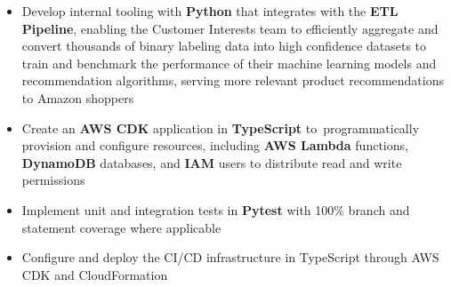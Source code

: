 \documentclass{article}
\newcommand{\resumesection}[3]{
    \subsection*{#1}
    \ 
    \normalsize
    \normalsize
    \hfill
    \textcolor{black}{#3}
    \normalsize
    \newline
    \small
    \textcolor{grey}{\emph{#2}}
}
\begin{document}
\begin{itemize}
    \item Develop internal tooling with \textbf{Python} that integrates with the \textbf{ETL Pipeline}, enabling the Customer Interests team to efficiently aggregate and convert thousands of binary labeling data into high confidence datasets to train and benchmark the performance of their machine learning models and recommendation algorithms, serving more relevant product recommendations to Amazon shoppers
    \item Create an \textbf{AWS CDK} application in \textbf{TypeScript} to\ programmatically provision and configure resources, including \textbf{AWS Lambda} functions, \textbf{DynamoDB} databases, and \textbf{IAM} users to distribute read and write permissions
    \item Implement unit and integration tests in \textbf{Pytest} with 100\% branch and statement coverage where applicable
    \item Configure and deploy the CI/CD infrastructure in TypeScript through AWS CDK and CloudFormation
\end{itemize}
\end{document}
